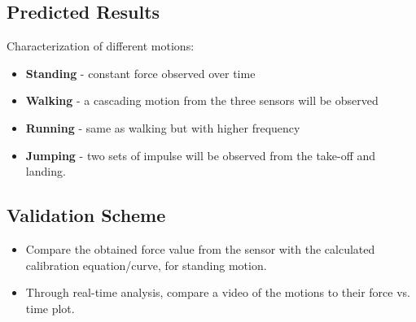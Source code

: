 \documentclass[12pt,a4paper]{article}
\begin{document}
\subsection*{Predicted Results}
Characterization of different motions:
\begin{itemize}
	\item \textbf{Standing} - constant force observed over time
	\item \textbf{Walking} - a cascading motion from the three sensors will be observed
	\item \textbf{Running} - same as walking but with higher frequency
	\item \textbf{Jumping} - two sets of impulse will be observed from the take-off and landing.
\end{itemize}

\subsection*{Validation Scheme}
\begin{itemize}
	\item Compare the obtained force value from the sensor with the calculated calibration equation/curve, for standing motion.
	\item Through real-time analysis, compare a video of the motions to their force vs. time plot.
\end{itemize}
\end{document}
